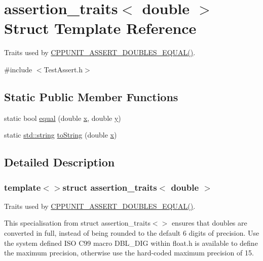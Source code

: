 \hypertarget{structassertion__traits_3_01double_01_4}{\section{assertion\-\_\-traits$<$ double $>$ Struct Template Reference}
\label{structassertion__traits_3_01double_01_4}
}


Traits used by \hyperlink{_test_assert_8h_a9d88b1e379e4a9ba2a5e9e79763389ea}{C\-P\-P\-U\-N\-I\-T\-\_\-\-A\-S\-S\-E\-R\-T\-\_\-\-D\-O\-U\-B\-L\-E\-S\-\_\-\-E\-Q\-U\-A\-L()}.  




{\ttfamily \#include $<$Test\-Assert.\-h$>$}

\subsection*{Static Public Member Functions}
\begin{DoxyCompactItemize}
\item 
static bool \hyperlink{structassertion__traits_3_01double_01_4_ac0d9d71ec0f239664b88188e481c0598}{equal} (double \hyperlink{glew_8h_ad77deca22f617d3f0e0eb786445689fc}{x}, double \hyperlink{glew_8h_a9298c7ad619074f5285b32c6b72bfdea}{y})
\item 
static \hyperlink{glew_8h_ae84541b4f3d8e1ea24ec0f466a8c568b}{std\-::string} \hyperlink{structassertion__traits_3_01double_01_4_a6bc37874eb60d30e0b50d4c127ab34df}{to\-String} (double \hyperlink{glew_8h_ad77deca22f617d3f0e0eb786445689fc}{x})
\end{DoxyCompactItemize}


\subsection{Detailed Description}
\subsubsection*{template$<$$>$struct assertion\-\_\-traits$<$ double $>$}

Traits used by \hyperlink{_test_assert_8h_a9d88b1e379e4a9ba2a5e9e79763389ea}{C\-P\-P\-U\-N\-I\-T\-\_\-\-A\-S\-S\-E\-R\-T\-\_\-\-D\-O\-U\-B\-L\-E\-S\-\_\-\-E\-Q\-U\-A\-L()}. 

This specialisation from {\ttfamily struct} {\ttfamily assertion\-\_\-traits$<$$>$} ensures that doubles are converted in full, instead of being rounded to the default 6 digits of precision. Use the system defined I\-S\-O C99 macro D\-B\-L\-\_\-\-D\-I\-G within float.\-h is available to define the maximum precision, otherwise use the hard-\/coded maximum precision of 15. 

